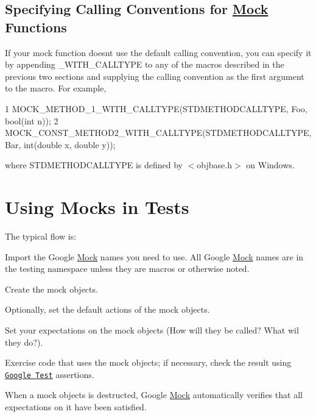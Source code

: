 \subsection*{Specifying Calling Conventions for \hyperlink{classMock}{Mock} Functions}

If your mock function doesn\textquotesingle{}t use the default calling convention, you can specify it by appending {\ttfamily \+\_\+\+W\+I\+T\+H\+\_\+\+C\+A\+L\+L\+T\+Y\+PE} to any of the macros described in the previous two sections and supplying the calling convention as the first argument to the macro. For example, 
\begin{DoxyCode}
1 MOCK\_METHOD\_1\_WITH\_CALLTYPE(STDMETHODCALLTYPE, Foo, bool(int n));
2 MOCK\_CONST\_METHOD2\_WITH\_CALLTYPE(STDMETHODCALLTYPE, Bar, int(double x, double y));
\end{DoxyCode}
 where {\ttfamily S\+T\+D\+M\+E\+T\+H\+O\+D\+C\+A\+L\+L\+T\+Y\+PE} is defined by {\ttfamily $<$objbase.\+h$>$} on Windows.

\section*{Using Mocks in Tests}

The typical flow is\+:
\begin{DoxyEnumerate}
\item Import the Google \hyperlink{classMock}{Mock} names you need to use. All Google \hyperlink{classMock}{Mock} names are in the {\ttfamily testing} namespace unless they are macros or otherwise noted.
\end{DoxyEnumerate}
\begin{DoxyEnumerate}
\item Create the mock objects.
\end{DoxyEnumerate}
\begin{DoxyEnumerate}
\item Optionally, set the default actions of the mock objects.
\end{DoxyEnumerate}
\begin{DoxyEnumerate}
\item Set your expectations on the mock objects (How will they be called? What wil they do?).
\end{DoxyEnumerate}
\begin{DoxyEnumerate}
\item Exercise code that uses the mock objects; if necessary, check the result using \href{http://code.google.com/p/googletest/}{\tt Google Test} assertions.
\end{DoxyEnumerate}
\begin{DoxyEnumerate}
\item When a mock objects is destructed, Google \hyperlink{classMock}{Mock} automatically verifies that all expectations on it have been satisfied.
\end{DoxyEnumerate}

